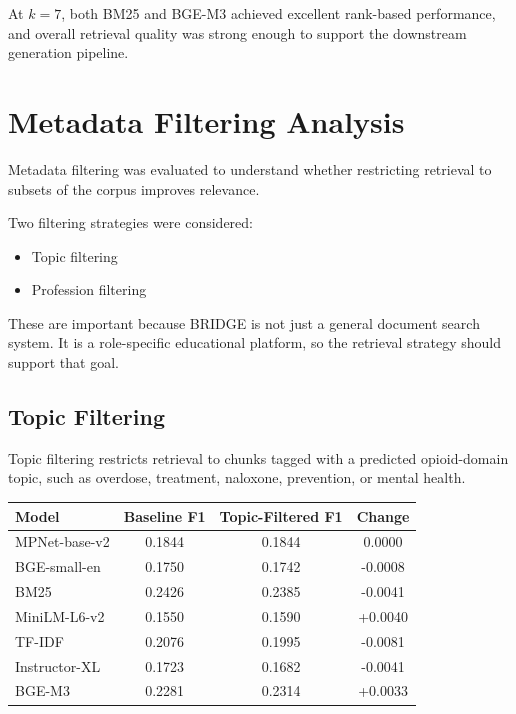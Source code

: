 \documentclass[12pt]{article}
\begin{document}
At $k = 7$, both BM25 and BGE-M3 achieved excellent rank-based performance, and overall retrieval quality was strong enough to support the downstream generation pipeline.

\section{Metadata Filtering Analysis}

Metadata filtering was evaluated to understand whether restricting retrieval to subsets of the corpus improves relevance.

Two filtering strategies were considered:

\begin{itemize}[leftmargin=1.5em]
    \item Topic filtering
    \item Profession filtering
\end{itemize}

These are important because BRIDGE is not just a general document search system. It is a role-specific educational platform, so the retrieval strategy should support that goal.

\subsection{Topic Filtering}

Topic filtering restricts retrieval to chunks tagged with a predicted opioid-domain topic, such as overdose, treatment, naloxone, prevention, or mental health.

\begin{center}
\begin{tabular}{>{\raggedright\arraybackslash}p{1.8in} c c c}
\toprule
\textbf{Model} & \textbf{Baseline F1} & \textbf{Topic-Filtered F1} & \textbf{Change} \\
\midrule
MPNet-base-v2 & 0.1844 & 0.1844 & 0.0000 \\
BGE-small-en & 0.1750 & 0.1742 & -0.0008 \\
BM25 & 0.2426 & 0.2385 & -0.0041 \\
MiniLM-L6-v2 & 0.1550 & 0.1590 & +0.0040 \\
TF-IDF & 0.2076 & 0.1995 & -0.0081 \\
Instructor-XL & 0.1723 & 0.1682 & -0.0041 \\
BGE-M3 & 0.2281 & 0.2314 & +0.0033 \\
\bottomrule
\end{tabular}
\end{center}
\end{document}
